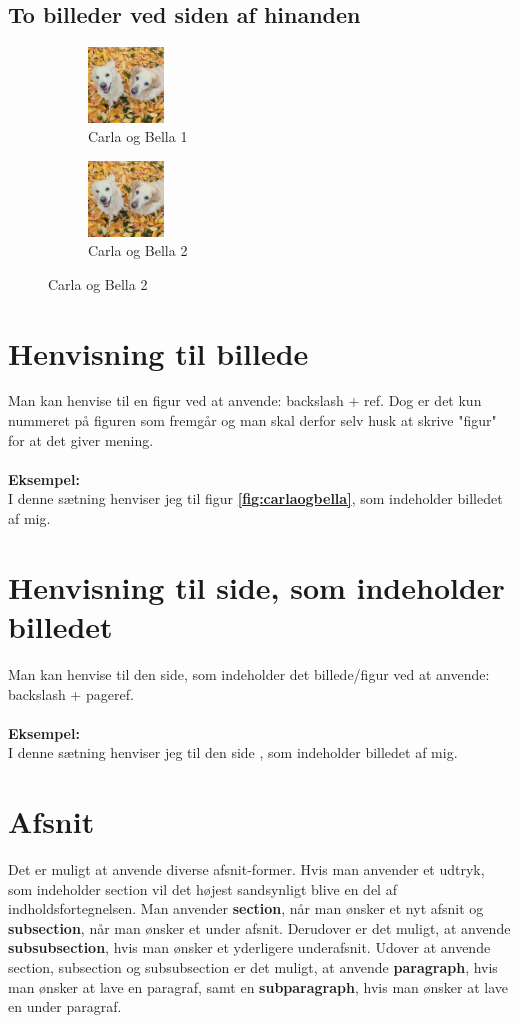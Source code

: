 \documentclass[11pt]{article}
\begin{document}
\subsection{To billeder ved siden af hinanden}
\begin{figure}[H]
\begin{subfigure}{0.5\textwidth}
\centering
\includegraphics[width=2cm]{carlaogbella}
\caption{Carla og Bella 1}
\label{fig:hunde1} 
\end{subfigure}
\begin{subfigure}{0.5\textwidth}
\centering
\includegraphics[width=2cm]{carlaogbella}
\caption{Carla og Bella 2}
\label{fig:hunde2} 
\end{subfigure}
\label{fig:image}
\end{figure}

\section{Henvisning til billede}
Man kan henvise til en figur ved at anvende: backslash + ref. Dog er det kun nummeret på figuren som fremgår og man skal derfor selv husk at skrive "figur" for at det giver mening.\\\\
\textbf{Eksempel:}\\ 
I denne sætning henviser jeg til figur \textbf{\ref{fig:carlaogbella}}, som indeholder billedet af mig.

\section{Henvisning til side, som indeholder billedet}
Man kan henvise til den side, som indeholder det billede/figur ved at anvende: backslash + pageref. \\\\
\textbf{Eksempel:}\\
I denne sætning henviser jeg til den side \textbf{\pageref{fig:carlaogbella}}, som indeholder billedet af mig.
\clearpage
\section{Afsnit}
Det er muligt at anvende diverse afsnit-former. Hvis man anvender et udtryk, som indeholder section vil det højest sandsynligt blive en del af indholdsfortegnelsen. Man anvender \textbf{section}, når man ønsker et nyt afsnit og \textbf{subsection}, når man ønsker et under afsnit. Derudover er det muligt, at anvende \textbf{subsubsection}, hvis man ønsker et yderligere underafsnit. Udover at anvende section, subsection og subsubsection er det muligt, at anvende \textbf{paragraph}, hvis man ønsker at lave en paragraf, samt en \textbf{subparagraph}, hvis man ønsker at lave en under paragraf.
\end{document}
